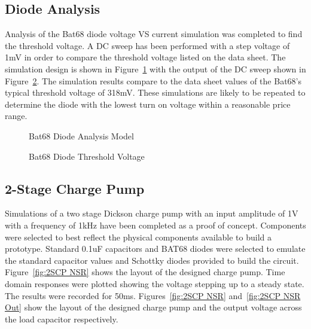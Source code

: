 \documentclass[12pt]{article}
\begin{document}
	\subsection{Diode Analysis}
Analysis of the Bat68 diode voltage VS current simulation was completed to find the threshold voltage. A DC sweep has been performed with a step voltage of 1mV in order to compare the threshold voltage listed on the data sheet. The simulation design is shown in Figure~\ref{fig:Bat68} with the output of the DC sweep shown in Figure~\ref{fig:Bat68sim}. The simulation results compare to the data sheet values of the Bat68's typical threshold voltage of 318mV. These simulations are likely to be repeated to determine the diode with the lowest turn on voltage within a reasonable price range.

\begin{figure}[H]
\caption{Bat68 Diode Analysis Model}
\label{fig:Bat68}
\end{figure}

\begin{figure}[H]
\caption{Bat68 Diode Threshold Voltage}
\label{fig:Bat68sim}
\end{figure}

	\subsection{2-Stage Charge Pump}

\noindent Simulations of a two stage Dickson charge pump with an input amplitude of 1V with a frequency of 1kHz have been completed as a proof of concept. Components were selected to best reflect the physical components available to build a prototype. Standard 0.1uF capacitors and BAT68 diodes were selected to emulate the standard capacitor values and Schottky diodes provided to build the circuit. Figure~\ref{fig:2SCP NSR} shows the layout of the designed charge pump. Time domain responses were plotted showing the voltage stepping up to a steady state. The results were recorded for 50ms. Figures~\ref{fig:2SCP NSR} and~\ref{fig:2SCP NSR Out} show the layout of the designed charge pump and the output voltage across the load capacitor respectively.
	
\end{document}
